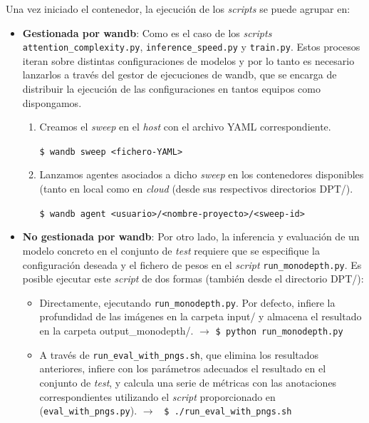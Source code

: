 Una vez iniciado el contenedor, la ejecución de los \textit{scripts} se puede agrupar en:
\begin{itemize}

\item \textbf{Gestionada por wandb}: Como es el caso de los \textit{scripts} \texttt{attention{\_}complexity.py}, \texttt{inference{\_}speed.py} y \texttt{train.py}. Estos procesos iteran sobre distintas configuraciones de modelos y por lo tanto es necesario lanzarlos a través del gestor de ejecuciones de wandb, que se encarga de distribuir la ejecución de las configuraciones en tantos equipos como dispongamos.

\begin{enumerate}

\item Creamos el \textit{sweep} en el \textit{host} con el archivo YAML correspondiente.

\texttt{\$ wandb sweep <fichero{-}YAML>}

\item Lanzamos agentes asociados a dicho \textit{sweep} en los contenedores disponibles (tanto en local como en \textit{cloud} (desde sus respectivos directorios DPT/).

\texttt{\$ wandb agent <usuario>/<nombre{-}proyecto>/<sweep{-}id>}

\end{enumerate}

\item \textbf{No gestionada por wandb}: Por otro lado, la inferencia y evaluación de un modelo concreto en el conjunto de \textit{test} requiere que se especifique la configuración deseada y el fichero de pesos en el \textit{script} \texttt{run{\_}monodepth.py}. Es posible ejecutar este \textit{script} de dos formas (también desde el directorio DPT/):

\begin{itemize}

\item Directamente, ejecutando \texttt{run{\_}monodepth.py}. Por defecto, infiere la profundidad de las imágenes en la carpeta input/ y almacena el resultado en la carpeta output{\_}monodepth/. $\rightarrow$ \texttt{\$ python run{\_}monodepth.py}

\item A través de \texttt{run{\_}eval{\_}with{\_}pngs.sh}, que elimina los resultados anteriores, infiere con los parámetros adecuados el resultado en el conjunto de \textit{test}, y calcula una serie de métricas con las anotaciones correspondientes utilizando el \textit{script} proporcionado en \cite{bts} (\texttt{eval{\_}with{\_}pngs.py}). $\rightarrow$ \texttt{ \$ ./run{\_}eval{\_}with{\_}pngs.sh}

\end{itemize}

\end{itemize}